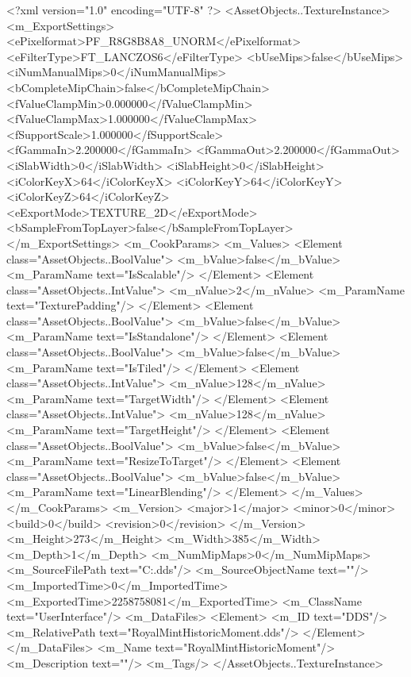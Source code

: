 <?xml version="1.0" encoding="UTF-8" ?>
<AssetObjects..TextureInstance>
	<m_ExportSettings>
		<ePixelformat>PF_R8G8B8A8_UNORM</ePixelformat>
		<eFilterType>FT_LANCZOS6</eFilterType>
		<bUseMips>false</bUseMips>
		<iNumManualMips>0</iNumManualMips>
		<bCompleteMipChain>false</bCompleteMipChain>
		<fValueClampMin>0.000000</fValueClampMin>
		<fValueClampMax>1.000000</fValueClampMax>
		<fSupportScale>1.000000</fSupportScale>
		<fGammaIn>2.200000</fGammaIn>
		<fGammaOut>2.200000</fGammaOut>
		<iSlabWidth>0</iSlabWidth>
		<iSlabHeight>0</iSlabHeight>
		<iColorKeyX>64</iColorKeyX>
		<iColorKeyY>64</iColorKeyY>
		<iColorKeyZ>64</iColorKeyZ>
		<eExportMode>TEXTURE_2D</eExportMode>
		<bSampleFromTopLayer>false</bSampleFromTopLayer>
	</m_ExportSettings>
	<m_CookParams>
		<m_Values>
			<Element class="AssetObjects..BoolValue">
				<m_bValue>false</m_bValue>
				<m_ParamName text="IsScalable"/>
			</Element>
			<Element class="AssetObjects..IntValue">
				<m_nValue>2</m_nValue>
				<m_ParamName text="TexturePadding"/>
			</Element>
			<Element class="AssetObjects..BoolValue">
				<m_bValue>false</m_bValue>
				<m_ParamName text="IsStandalone"/>
			</Element>
			<Element class="AssetObjects..BoolValue">
				<m_bValue>false</m_bValue>
				<m_ParamName text="IsTiled"/>
			</Element>
			<Element class="AssetObjects..IntValue">
				<m_nValue>128</m_nValue>
				<m_ParamName text="TargetWidth"/>
			</Element>
			<Element class="AssetObjects..IntValue">
				<m_nValue>128</m_nValue>
				<m_ParamName text="TargetHeight"/>
			</Element>
			<Element class="AssetObjects..BoolValue">
				<m_bValue>false</m_bValue>
				<m_ParamName text="ResizeToTarget"/>
			</Element>
			<Element class="AssetObjects..BoolValue">
				<m_bValue>false</m_bValue>
				<m_ParamName text="LinearBlending"/>
			</Element>
		</m_Values>
	</m_CookParams>
	<m_Version>
		<major>1</major>
		<minor>0</minor>
		<build>0</build>
		<revision>0</revision>
	</m_Version>
	<m_Height>273</m_Height>
	<m_Width>385</m_Width>
	<m_Depth>1</m_Depth>
	<m_NumMipMaps>0</m_NumMipMaps>
	<m_SourceFilePath text="C:\Users\aaron\Downloads\RoyalMintHistoricMoment.dds"/>
	<m_SourceObjectName text=""/>
	<m_ImportedTime>0</m_ImportedTime>
	<m_ExportedTime>2258758081</m_ExportedTime>
	<m_ClassName text="UserInterface"/>
	<m_DataFiles>
		<Element>
			<m_ID text="DDS"/>
			<m_RelativePath text="RoyalMintHistoricMoment.dds"/>
		</Element>
	</m_DataFiles>
	<m_Name text="RoyalMintHistoricMoment"/>
	<m_Description text=""/>
	<m_Tags/>
</AssetObjects..TextureInstance>

